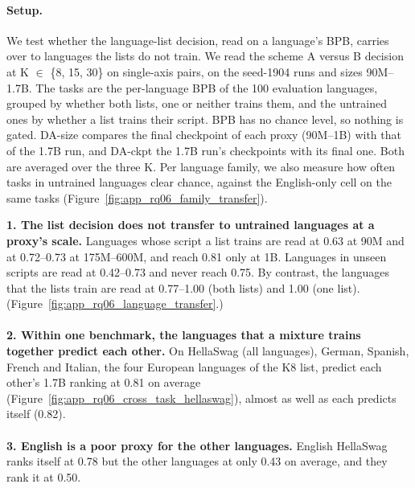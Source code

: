 {\begin{minipage}[t]{0.485\textwidth}
\paragraph{Setup.} We test whether the language-list decision, read on a language's BPB, carries over to languages the lists do not train. We read the scheme A versus B decision at K $\in$ \{8, 15, 30\} on single-axis pairs, on the seed-1904 runs and sizes 90M--1.7B. The tasks are the per-language BPB of the 100 evaluation languages, grouped by whether both lists, one or neither trains them, and the untrained ones by whether a list trains their script. BPB has no chance level, so nothing is gated. DA-size compares the final checkpoint of each proxy (90M--1B) with that of the 1.7B run, and DA-ckpt the 1.7B run's checkpoints with its final one. Both are averaged over the three K. Per language family, we also measure how often tasks in untrained languages clear chance, against the English-only cell on the same tasks (Figure~\ref{fig:app_rq06_family_transfer}).
\end{minipage}\hfill
\begin{minipage}[t]{0.485\textwidth}
\vspace{0pt}
\begin{rqfinding}
\textbf{1. The list decision does not transfer to untrained languages at a proxy's scale.} Languages whose script a list trains are read at 0.63 at 90M and at 0.72--0.73 at 175M--600M, and reach 0.81 only at 1B. Languages in unseen scripts are read at 0.42--0.73 and never reach 0.75. By contrast, the languages that the lists train are read at 0.77--1.00 (both lists) and 1.00 (one list). (Figure~\ref{fig:app_rq06_language_transfer}.)
\\
\\
\textbf{2. Within one benchmark, the languages that a mixture trains together predict each other.} On HellaSwag (all languages), German, Spanish, French and Italian, the four European languages of the K8 list, predict each other's 1.7B ranking at 0.81 on average (Figure~\ref{fig:app_rq06_cross_task_hellaswag}), almost as well as each predicts itself (0.82).
\\
\\
\textbf{3. English is a poor proxy for the other languages.} English HellaSwag ranks itself at 0.78 but the other languages at only 0.43 on average, and they rank it at 0.50.
\end{rqfinding}
\end{minipage}

}
